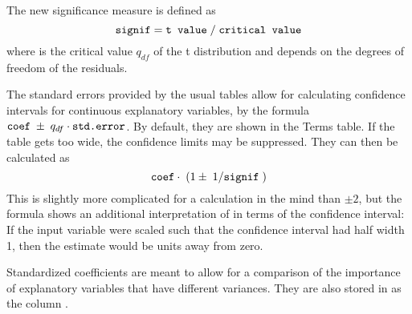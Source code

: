 \documentclass[11pt]{article}\usepackage[]{graphicx}\usepackage[]{color}
\begin{document}
The new significance measure is defined as
\[
  \texttt{signif} = \texttt{t value}\;/\; \texttt{critical value}
\]
where  is the critical value $q_{df}$ of the 
t distribution and depends on the degrees of freedom of the residuals. 

The standard errors provided by the usual  tables allow for
calculating confidence intervals for continuous explanatory variables,
by the formula $\texttt{coef} \;\pm\; q_{df}\cdot\texttt{std.error}$.
By default, they are shown in the Terms table. 
If the table gets too wide, the confidence limits may be suppressed.
They can then be calculated as
\[
  \texttt{coef}\cdot\;(1\pm\;1/\texttt{signif}\;)
\]
This is slightly more complicated for a calculation in the mind than
$\pm 2$, 
but the formula shows an additional interpretation of  
in terms of the confidence interval:
If the input variable were scaled such that the confidence interval had 
half width 1, then the estimate would be  units away from zero.

Standardized coefficients are meant to allow for a comparison of the 
importance of explanatory variables that have different variances.
They are also stored in  as the column .
\end{document}
